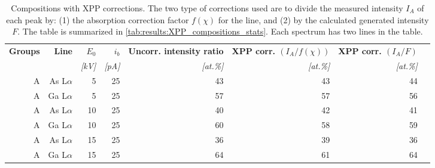 \begin{table}[phtb]
    \begin{center}
        \caption{
            Compositions with XPP corrections.
            The two type of corrections used are to divide the measured intensity $I_A$ of each peak by: (1) the absorption correction factor $f(\chi)$ for the line, and (2) by the calculated generated intensity $F$.
            The table is summarized in \cref{tab:results:XPP_compositions_stats}.
            Each spectrum has two lines in the table.
        }
        \label{tab:results:XPP_compositions}
        \begin{tabular}{rrrrrrrr}
            \hline
            \textbf{Groups} & \textbf{Line} & \textbf{$E_0$} & \textbf{$i_b$} & \textbf{Uncorr. intensity ratio} & \textbf{XPP corr. $(I_A/f(\chi))$} & \textbf{XPP corr. $(I_A/F)$} \\
            \emph{}         & \emph{}       & \emph{[kV]}    & \emph{[pA]}    & \emph{[at.\%]}                    & \emph{[at.\%]}                      & \emph{[at.\%]}                \\
            \hline
            A               & As L$\alpha$  & 5              & 25             & 43                               & 43                                 & 44                           \\
            A               & Ga L$\alpha$  & 5              & 25             & 57                               & 57                                 & 56                           \\
            A               & As L$\alpha$  & 10             & 25             & 40                               & 42                                 & 41                           \\
            A               & Ga L$\alpha$  & 10             & 25             & 60                               & 58                                 & 59                           \\
            A               & As L$\alpha$  & 15             & 25             & 36                               & 39                                 & 36                           \\
            A               & Ga L$\alpha$  & 15             & 25             & 64                               & 61                                 & 64                           \\

\end{tabular}
\end{center}
\end{table}
